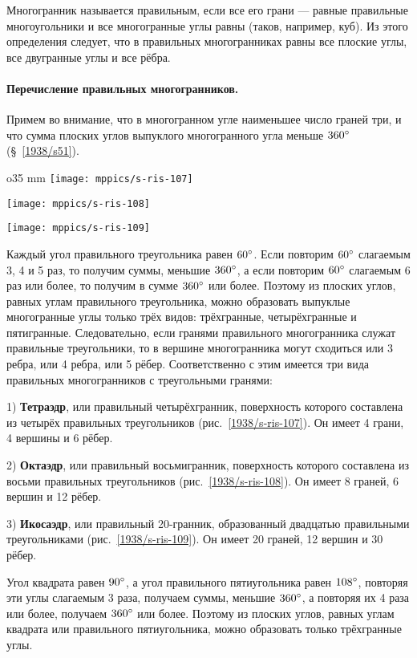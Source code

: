 Многогранник называется правильным, если все его грани — равные правильные многоугольники и все многогранные углы равны (таков, например, куб).
Из этого определения следует, что в правильных многогранниках равны все плоские углы, все двугранные углы и все рёбра.

\paragraph{Перечисление правильных многогранников.}\label{1938/s97}
Примем во внимание, что в многогранном угле наименьшее число граней три, и что сумма плоских углов выпуклого многогранного угла меньше $360\degree$ (§~\ref{1938/s51}).

\begin{wrapfigure}{o}{35 mm}
\vskip-0mm
\centering
\texttt{[image: mppics/s-ris-107]}
\caption{}\label{1938/s-ris-107}
\bigskip
\texttt{[image: mppics/s-ris-108]}
\caption{}\label{1938/s-ris-108}
\bigskip
\texttt{[image: mppics/s-ris-109]}
\caption{}\label{1938/s-ris-109}
\vskip-0mm
\end{wrapfigure}

Каждый угол правильного треугольника равен $60\degree$.
Если повторим $60\degree$ слагаемым 3, 4 и 5 раз, то получим суммы, меньшие $360\degree$, а если повторим $60\degree$ слагаемым 6 раз или более, то получим в сумме $360\degree$ или более.
Поэтому из плоских углов, равных углам правильного треугольника, можно образовать выпуклые многогранные углы только трёх видов: трёхгранные, четырёхгранные и пятигранные.
Следовательно, если гранями правильного многогранника служат правильные треугольники, то в вершине многогранника могут сходиться или 3 ребра, или 4 ребра, или 5 рёбер.
Соответственно с этим имеется три вида правильных многогранников с треугольными гранями:

1) \textbf{Тетраэдр}, или правильный четырёхгранник, поверхность которого составлена из четырёх правильных треугольников (рис.~\ref{1938/s-ris-107}).
Он имеет 4 грани, 4 вершины и 6 рёбер.

2) \textbf{Октаэдр}, или правильный восьмигранник, поверхность которого составлена из восьми правильных треугольников (рис.~\ref{1938/s-ris-108}).
Он имеет 8 граней, 6 вершин и 12 рёбер.

3) \textbf{Икосаэдр}, или правильный 20-гранник, образованный двадцатью правильными треугольниками (рис.~\ref{1938/s-ris-109}).
Он имеет 20 граней, 12 вершин и 30 рёбер.

Угол квадрата равен $90\degree$, а угол правильного пятиугольника равен $108\degree$, повторяя эти углы слагаемым 3 раза, получаем суммы, меньшие $360\degree$, а повторяя их 4 раза или более, получаем $360\degree$ или более.
Поэтому из плоских углов, равных углам квадрата или правильного пятиугольника, можно образовать только трёхгранные углы.

